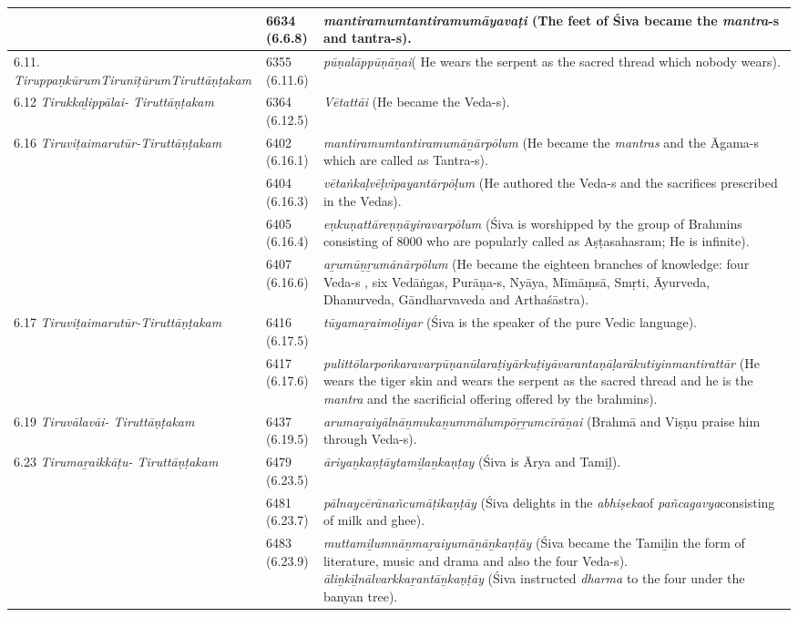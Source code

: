 \begin{longtable}{|m{2.7cm}|m{2.7cm}|>{\raggedright}m{3.1cm}|}
\hline
 & 6634 (6.6.8) & \textit{mantiramumtantira\-mumāyavaṭi} (The feet of Śiva  became the \textit{mantra}-s and tantra-s). \tabularnewline
\hline
6.11. \textit{Tiruppaṇkūrum\-Tirunīṭūrum\-Tiruttāṇṭakam} & 6355 (6.11.6) & \textit{pūṇalāppūṇāṉai}( He wears the serpent as the sacred thread which nobody wears). \tabularnewline
\hline
6.12 \textit{Tirukkaḻippālai- Tiruttāṇṭakam} & 6364 (6.12.5) & \textit{Vētattāi} (He became the Veda-s). \tabularnewline
\hline
6.16 \textit{Tiruviṭaimarutūr-Tiruttāṇṭakam} & 6402 (6.16.1) & \textit{mantiramumtantira\-mumāṉārpōlum}  (He became the \textit{mantras }and the Āgama-s\index{Agama@Āgama} which are called as Tantra-s). \tabularnewline
\hline
 & 6404 (6.16.3) & \textit{vētaṅkaḷvēḷvipayantār\-pōḷum} (He authored the Veda-s and the sacrifices prescribed in the Vedas). \tabularnewline
\hline
 & 6405 (6.16.4) & \textit{eṇkuṇattāreṇṇāyiravar\-pōlum} (Śiva\index{Siva@Śiva} is worshipped by the group of Brahmins consisting of 8000 who are popularly called as Aṣṭasahasram; He is infinite). \tabularnewline
\hline
 & 6407 (6.16.6) & \textit{aṟumūṉṟumānārpōlum} (He became the eighteen branches of knowledge: four Veda-s , six Vedāṅgas, Purāṇa-s, Nyāya, Mīmāṃsā, Smṛti, Āyurveda, Dhanurveda, Gāndharvaveda and Arthaśāstra\index{Arthasastra@Arthaśāstra}). \tabularnewline
\hline
6.17 \textit{Tiruviṭaimarutūr-Tiruttāṇṭakam} & 6416 (6.17.5) & \textit{tūyamaṟaimoḻiyar} (Śiva is the speaker of the pure Vedic language\index{Vedic language}). \tabularnewline
\hline
 & 6417 (6.17.6) & \textit{pulittōlarpoṅkaravar\-pūṇanūlaraṭiyārkuṭi\-yāvarantaṇāḷarākuti\-yinmantirattār} (He wears the tiger skin and wears the serpent as the sacred thread and  he is the \textit{mantra} and the sacrificial offering offered by the brahmins). \tabularnewline
\hline
6.19 \textit{Tiruvālavāi- Tiruttāṇṭakam} & 6437 (6.19.5) & \textit{arumaṟaiyālnāṉmuka\-ṉummālumpōṟṟumcī\-rāṉai} (Brahmā\index{Brahma@Brahmā} and Viṣṇu\index{Visnu@Viṣṇu} praise him through Veda-s). \tabularnewline
\hline
6.23 \textit{Tirumaṟaikkāṭu- Tiruttāṇṭakam} & 6479 (6.23.5) & \textit{āriyaṉkaṇṭāytamiḻaṉ\-kaṇṭay} (Śiva is Ārya and Tamiḻ). \tabularnewline
\hline
 & 6481 (6.23.7) & \textit{pālnaycērānañcumāṭi\-kaṇṭāy} (Śiva delights in the \textit{abhiṣeka}of \textit{pañcagavya}consisting of milk and ghee). \tabularnewline
\hline
 & 6483 (6.23.9) & \textit{muttamiḻumnāṉmaṟai\-yumāṉāṉkaṇṭāy} (Śiva became the Tamiḻin the form of literature, music and drama and also the four Veda-s). \textit{āliṉkīḻnālvarkkaṟantāṉkaṇṭāy} (Śiva instructed \textit{dharma} to the four under the banyan tree). \tabularnewline

\end{longtable}
